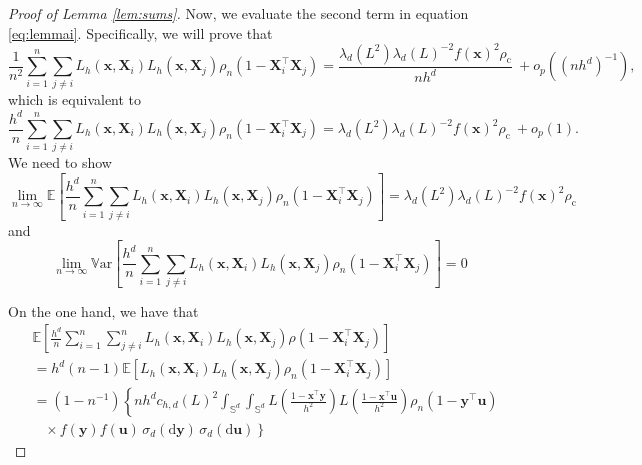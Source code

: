\documentclass[12pt]{report} %
\newcommand{\bX}{\mathbf{X}}
\newcommand{\bx}{\mathbf{x}}
\newcommand{\by}{\mathbf{y}}
\newcommand{\bu}{\boldsymbol{u}}
\newcommand{\sigmad}{\sigma_{d}}
\newcommand{\Sd}{\mathbb{S}^{d}}
\newcommand{\lc}{\left[}
\newcommand{\rc}{\right]}
\newcommand{\lrp}[1]{\left(#1\right)}
\newcommand{\lrc}[1]{\left[#1\right]}
\newcommand{\V}[1]{\mathbb{V}\mathrm{ar}\lc #1\rc}
\begin{document}
\begin{proof}[Proof of Lemma \ref{lem:sums}]
Now, we evaluate the second term in equation \eqref{eq:lemmai}. Specifically, we will prove that 
$$\frac{1}{n^2} \sum_{i=1}^n\sum_{j\neq i} L_h\left(\bx, \bX_i\right)L_h\left(\bx, \bX_j\right)  \rho_n\left(1-\bX_i^\top\bX_j\right)=\frac{\lambda_d\left(L^2\right) \lambda_d(L)^{-2} f(\bx)^2  \rho_{\mathrm{c}}}{n h^d}\ +o_p\lrp{\lrp{n h^d}^{-1}},$$ which is equivalent to
$$
\frac{h^d}{n} \sum_{i=1}^n\sum_{j\neq i} L_h\left(\bx, \bX_i\right)L_h\left(\bx, \bX_j\right)  \rho_n\left(1-\bX_i^\top\bX_j\right)=\lambda_d\left(L^2\right) \lambda_d(L)^{-2} f(\bx)^2  \rho_{\mathrm{c}}\ +o_p\lrp{1}.
$$
We need to show
$$
\lim _{n \rightarrow \infty} \mathbb{E}\lrc{\frac{h^d}{n} \sum_{i=1}^n\sum_{j\neq i} L_h\left(\bx, \bX_i\right)L_h\left(\bx, \bX_j\right)  \rho_n\left(1-\bX_i^\top\bX_j\right)}=\lambda_d\left(L^2\right) \lambda_d(L)^{-2} f(\bx)^2  \rho_{\mathrm{c}}\
$$
and
$$
\lim _{n \rightarrow \infty} \V{\frac{h^d}{n} \sum_{i=1}^n\sum_{j\neq i} L_h\left(\bx, \bX_i\right)L_h\left(\bx, \bX_j\right)  \rho_n\left(1-\bX_i^\top\bX_j\right)}=0
$$

On the one hand, we have that 
\begin{align}
&\mathbb{E}\left[\frac{h^d}{n} \sum_{i=1}^n \sum_{j \neq i}^n L_h\left(\bx, \bX_i\right) L_h\left(\bx,\bX_j\right) \rho\left(1-\bX_i^{\top} \bX_j\right)\right] \nonumber \\
&= h^d (n-1) \mathbb{E}\left[L_h\left(\bx, \bX_i\right) L_h\left(\bx,\bX_j\right) \rho_n\left(1-\bX_i^{\top} \bX_j\right)\right] \nonumber\\
&= (1 - n^{-1}) \left\{
    n h^d c_{h,d}(L)^2
    \int_{\Sd} \int_{\Sd}
    L\!\left(\frac{1 - \bx^\top \by}{h^2}\right)
    L\!\left(\frac{1 - \bx^\top \bu}{h^2}\right)
    \rho_n\!\left(1 - \by^\top \bu\right)\right.\nonumber\\
    &\quad \left.\times
    \,f(\by) f(\bu)\,
    \sigmad(\mathrm{d}\by)
    \,\sigmad(\mathrm{d}\bu)
\right\} \label{eq:expr1}
\end{align}



\end{proof}
\end{document}
